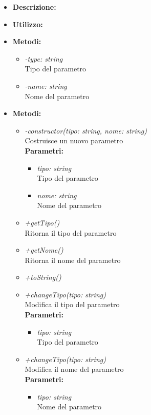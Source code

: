 \begin{itemize}
	\item \textbf{Descrizione:}\\
	
	\item \textbf{Utilizzo:}\\
	
	\item \textbf{Metodi:}
		\begin{itemize}
			\item \emph{-type: string}\\
    		Tipo del parametro
    		\item \emph{-name: string}\\
    		Nome del parametro
		\end{itemize}
	\item \textbf{Metodi:}
		\begin{itemize}
			\item \emph{-constructor(tipo: string, nome: string)}\\
    		Costruisce un nuovo parametro\\
    		\textbf{Parametri:}
    		\begin{itemize}
    			\item \emph{tipo: string}\\
    			Tipo del parametro
    			\item \emph{nome: string}\\
    			Nome del parametro
    		\end{itemize}
    		\item \emph{+getTipo()}\\
    		Ritorna il tipo del parametro
    		\item \emph{+getNome()}\\
    		Ritorna il nome del parametro
    		\item \emph{+toString()}\\
    		
    		\item \emph{+changeTipo(tipo: string)}\\
    		Modifica il tipo del parametro\\
    		\textbf{Parametri:}
    		\begin{itemize}
    			\item \emph{tipo: string}\\
    			Tipo del parametro
    		\end{itemize}
    		\item \emph{+changeTipo(tipo: string)}\\
    		Modifica il nome del parametro\\
    		\textbf{Parametri:}
    		\begin{itemize}
    			\item \emph{tipo: string}\\
    			Nome del parametro
    		\end{itemize}
    	\end{itemize}
\end{itemize}